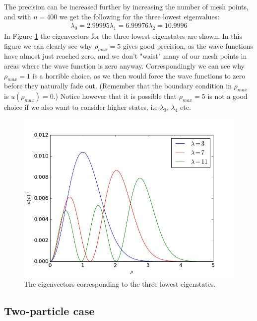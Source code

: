 \documentclass[12pt, a4paper]{article}
\begin{document}
The precision can be increased further by increasing the number of mesh points, and with $n = 400$ we get 
the following for the three lowest eigenvalues: 
\begin{align*}
\lambda_0 = 2.99995
\lambda_1 = 6.99976
\lambda_2 = 10.9996
\end{align*}
In Figure \ref{fig:eigenvectors_1p} the eigenvectors for the three lowest eigenstates are shown. In this 
figure we can clearly see why $\rho_{max} = 5$ gives good precision, as the wave functions have almost 
just reached zero, and we don't "waist" many of our mesh points in areas where the wave function is 
zero anyway. Correspondingly we can see why $\rho_{max} = 1$ is a horrible choice, as we then would 
force the wave functions to zero before they naturally fade out. (Remember that the boundary condition 
in $\rho_{max}$ is $u(\rho_{max}) = 0$.) Notice however that it is possible that $\rho_{max} = 5$ is not 
a good choice if we also want to consider higher states, i.e $\lambda_3$, $\lambda_4$ etc. 
\begin{figure}[ht!]
\begin{center}
\includegraphics[scale=0.7]{../Programs/Output/Eigenvectors_1pHO.png}
\caption{The eigenvectors corresponding to the three lowest eigenstates.}
\label{fig:eigenvectors_1p}
\end{center}
\end{figure}



\subsection{Two-particle case}
\end{document}
